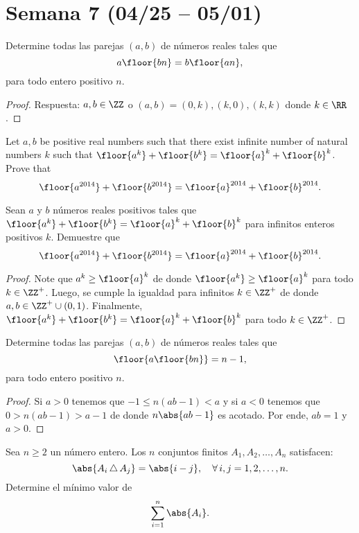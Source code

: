 \section{Semana 7 (04/25 -- 05/01)}


\begin{probEG}
	Determine todas las parejas $(a,b)$ de números reales tales que
	\[a\floor{bn}=b\floor{an},\]
	para todo entero positivo $n$.
\end{probEG}

\begin{proof}
	Respuesta: $a,b\in\ZZ$ o $(a,b)=(0,k),(k,0),(k,k)$ donde $k\in\RR$.
\end{proof}

\begin{probEG}
	Let $a,b$ be positive real numbers such that there exist infinite number of natural numbers $k$ such that $\floor{a^k}+\floor{b^k}=\floor{a}^k+\floor{b}^k$. Prove that
	\[\floor{a^{2014}}+\floor{b^{2014}}=\floor{a}^{2014}+\floor{b}^{2014}.\]
	\begin{probSM}
		Sean $a$ y $b$ números reales positivos tales que $\floor{a^k}+\floor{b^k}=\floor{a}^k+\floor{b}^k$ para infinitos enteros positivos $k$. Demuestre que
		\[\floor{a^{2014}}+\floor{b^{2014}}=\floor{a}^{2014}+\floor{b}^{2014}.\]
	\end{probSM}
\end{probEG}

\begin{proof}
	Note que $a^k\ge\floor{a}^k$ de donde $\floor{a^k}\ge\floor{a}^k$ para todo $k\in\ZZ^+$. Luego, se cumple la igualdad para infinitos $k\in\ZZ^+$ de donde $a,b\in\ZZ^+\cup(0,1)$. Finalmente, $\floor{a^k}+\floor{b^k}=\floor{a}^k+\floor{b}^k$ para todo $k\in\ZZ^+$.
\end{proof}

\begin{probEG}
	Determine todas las parejas $(a,b)$ de números reales tales que
	\[\floor{a\floor{bn}}=n-1,\]
	para todo entero positivo $n$.
\end{probEG}

\begin{proof}
	Si $a>0$ tenemos que $-1\le n(ab-1)<a$ y si $a<0$ tenemos que $0>n(ab-1)>a-1$ de donde $n\abs{ab-1}$ es acotado. Por ende, $ab=1$ y $a>0$.
\end{proof}

\begin{probMG}
	Sea $n\ge 2$ un número entero. Los $n$ conjuntos finitos $A_1,A_2,\dots,A_n$ satisfacen:
	\[\abs{A_i\,\triangle\,A_j}=\abs{i-j},\quad\forall\,i,j=1,2,\dots,n.\]
	Determine el mínimo valor de
	\[\sum_{i=1}^n\abs{A_i}.\]
\end{probMG}

